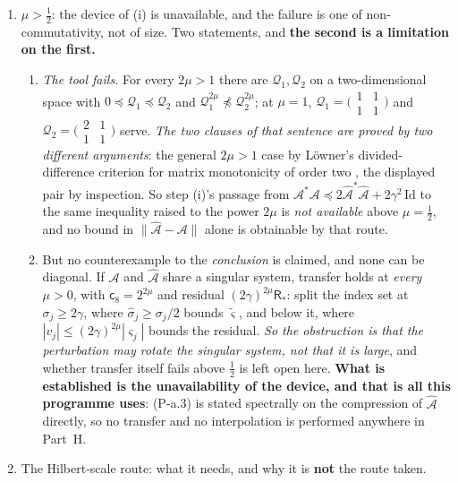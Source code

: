 \begin{lemma}
\begin{enumerate}
\item[(ii)] $\mu>\tfrac12$: the device of (i) is unavailable, and the failure is one of
non-commutativity, not of size. Two statements, and \textbf{the second is a limitation on the first.}
\begin{enumerate}
\item[(ii.a)] \emph{The tool fails.} For every $2\mu>1$ there are $\mathcal Q_1,\mathcal Q_2$ on a
two-dimensional space with $0\preceq\mathcal Q_1\preceq\mathcal Q_2$ and
$\mathcal Q_1^{2\mu}\not\preceq\mathcal Q_2^{2\mu}$; at $\mu=1$,
$\mathcal Q_1=\big(\begin{smallmatrix}1&1\\1&1\end{smallmatrix}\big)$ and
$\mathcal Q_2=\big(\begin{smallmatrix}2&1\\1&1\end{smallmatrix}\big)$ serve. \emph{The two clauses of
that sentence are proved by two different arguments}: the general $2\mu>1$ case by L\"owner's
divided-difference criterion for matrix monotonicity of order two \citep[Ch.~V]{bhatia1997}, the
displayed pair by inspection. So step (i)'s passage from
$\mathcal A^\ast\mathcal A\preceq2\hat{\mathcal A}^\ast\hat{\mathcal A}+2\gamma^{2}\,\mathrm{Id}$ to the same
inequality raised to the power $2\mu$ is \emph{not available} above $\mu=\tfrac12$, and no bound in
$\|\hat{\mathcal A}-\mathcal A\|$ alone is obtainable by that route.
\item[(ii.b)] But no counterexample to the \emph{conclusion} is claimed, and none can be
diagonal. If $\mathcal A$ and $\hat{\mathcal A}$ share a singular system, transfer holds at
\emph{every} $\mu>0$, with $\mathsf c_8=2^{2\mu}$ and residual $(2\gamma)^{2\mu}\mathsf R_\ast$: split the
index set at $\sigma_j\ge2\gamma$, where $\hat\sigma_j\ge\sigma_j/2$ bounds $\tilde\varsigma$, and
below it, where $|v_j|\le(2\gamma)^{2\mu}|\varsigma_j|$ bounds the residual. \emph{So the obstruction is
that the perturbation may rotate the singular system, not that it is large}, and whether transfer
itself fails above $\tfrac12$ is left open here. \textbf{What is established is the unavailability of
the device, and that is all this programme uses}: (P-a.3) is stated spectrally on the compression of
$\hat{\mathcal A}$ directly, so no transfer and no interpolation is performed anywhere in Part~H.
\end{enumerate}
\item[(iii)] The Hilbert-scale route: what it needs, and why it is \textbf{not} the route taken.

\end{enumerate}
\end{lemma}
